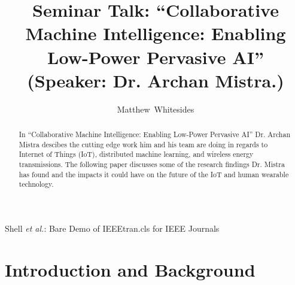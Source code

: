 \documentclass[journal,onecolumn]{IEEEtran}
\begin{document}
%
\title{Seminar Talk: ``Collaborative Machine Intelligence: Enabling Low-Power Pervasive AI'' (Speaker: Dr. Archan Mistra.)}

%
%
%
\author{Matthew~Whitesides}%

%
{Shell \MakeLowercase{\textit{et al.}}: Bare Demo of IEEEtran.cls for IEEE Journals}

\maketitle

\begin{abstract}
  In ``Collaborative Machine Intelligence: Enabling Low-Power Pervasive AI'' Dr. Archan Mistra descibes the cutting edge work him and his team are doing in regards to Internet of Things (IoT), distributed machine learning, and wireless energy transmissions. The following paper discusses some of the research findings Dr. Mistra has found and the impacts it could have on the future of the IoT and human wearable technology. 
\end{abstract}


\IEEEpeerreviewmaketitle

\section{Introduction and Background}
\end{document}
